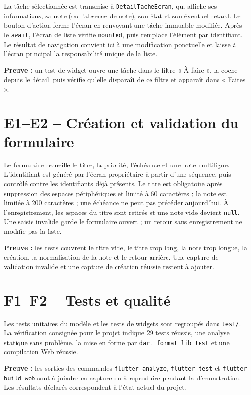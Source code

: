 \documentclass[12pt,a4paper]{report}
\begin{document}
La tâche sélectionnée est transmise à \texttt{DetailTacheEcran}, qui affiche ses informations, sa note (ou l’absence de note), son état et son éventuel retard. Le bouton d’action ferme l’écran en renvoyant une tâche immuable modifiée. Après le \texttt{await}, l’écran de liste vérifie \texttt{mounted}, puis remplace l’élément par identifiant. Le résultat de navigation convient ici à une modification ponctuelle et laisse à l’écran principal la responsabilité unique de la liste.

\textbf{Preuve :} un test de widget ouvre une tâche dans le filtre « À faire », la coche depuis le détail, puis vérifie qu’elle disparaît de ce filtre et apparaît dans « Faites ».

\section{E1--E2 -- Création et validation du formulaire}

Le formulaire recueille le titre, la priorité, l’échéance et une note multiligne. L’identifiant est généré par l’écran propriétaire à partir d’une séquence, puis contrôlé contre les identifiants déjà présents. Le titre est obligatoire après suppression des espaces périphériques et limité à 60 caractères ; la note est limitée à 200 caractères ; une échéance ne peut pas précéder aujourd’hui. À l’enregistrement, les espaces du titre sont retirés et une note vide devient \texttt{null}. Une saisie invalide garde le formulaire ouvert ; un retour sans enregistrement ne modifie pas la liste.

\textbf{Preuve :} les tests couvrent le titre vide, le titre trop long, la note trop longue, la création, la normalisation de la note et le retour arrière. Une capture de validation invalide et une capture de création réussie restent à ajouter.

\section{F1--F2 -- Tests et qualité}

Les tests unitaires du modèle et les tests de widgets sont regroupés dans \texttt{test/}. La vérification consignée pour le projet indique 29 tests réussis, une analyse statique sans problème, la mise en forme par \texttt{dart format lib test} et une compilation Web réussie.

\textbf{Preuve :} les sorties des commandes \texttt{flutter analyze}, \texttt{flutter test} et \texttt{flutter build web} sont à joindre en capture ou à reproduire pendant la démonstration. Les résultats déclarés correspondent à l’état actuel du projet.
\end{document}
